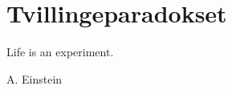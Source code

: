\chapter{Tvillingeparadokset}
\label{sec:Tvillingeparadokset}
\epigraph{Life is an experiment.}{A. Einstein}
\minitoc
\clearpage

\lipsum